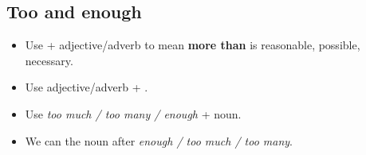 \subsection{Too and enough}
\begin{itemize}
    \item Use  + adjective/adverb to mean \textbf{more than} is reasonable, possible, necessary.
    \item Use adjective/adverb + .
    \item Use \textit{too much / too many / enough} + noun.
    \item We can  the noun after \textit{enough / too much / too many}.
\end{itemize}